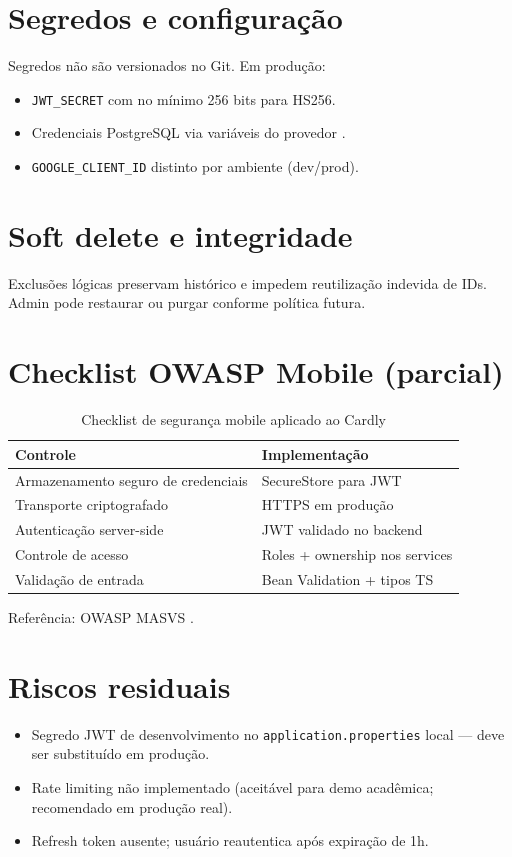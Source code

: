 \section{Segredos e configuração}

Segredos não são versionados no Git. Em produção:
\begin{itemize}
    \item \texttt{JWT\_SECRET} com no mínimo 256 bits para HS256.
    \item Credenciais PostgreSQL via variáveis do provedor \cite{twelve_factor,railway_docs}.
    \item \texttt{GOOGLE\_CLIENT\_ID} distinto por ambiente (dev/prod).
\end{itemize}

\section{Soft delete e integridade}

Exclusões lógicas preservam histórico e impedem reutilização indevida de IDs. Admin pode restaurar ou purgar conforme política futura.

\section{Checklist OWASP Mobile (parcial)}

\begin{table}[htbp]
    \caption{Checklist de segurança mobile aplicado ao Cardly}
    \label{tab:owasp}
    \centering
    \small
    \begin{tabular}{p{5cm} p{8cm}}
        \toprule
        \textbf{Controle} & \textbf{Implementação} \\
        \midrule
        Armazenamento seguro de credenciais & SecureStore para JWT \\
        Transporte criptografado & HTTPS em produção \\
        Autenticação server-side & JWT validado no backend \\
        Controle de acesso & Roles + ownership nos services \\
        Validação de entrada & Bean Validation + tipos TS \\
        \bottomrule
    \end{tabular}
\end{table}

Referência: OWASP MASVS \cite{owasp_mobile}.

\section{Riscos residuais}

\begin{itemize}
    \item Segredo JWT de desenvolvimento no \texttt{application.properties} local --- deve ser substituído em produção.
    \item Rate limiting não implementado (aceitável para demo acadêmica; recomendado em produção real).
    \item Refresh token ausente; usuário reautentica após expiração de 1h.
\end{itemize}
